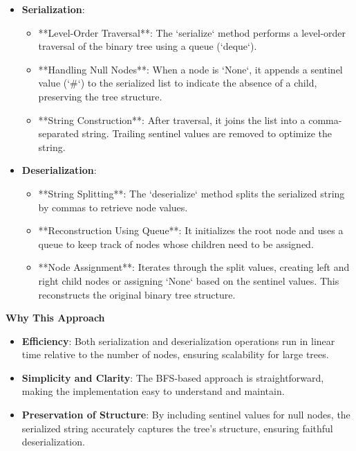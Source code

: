 \begin{itemize}
    \item \textbf{Serialization}:
    \begin{itemize}
        \item **Level-Order Traversal**: The `serialize` method performs a level-order traversal of the binary tree using a queue (`deque`).
        \item **Handling Null Nodes**: When a node is `None`, it appends a sentinel value (`\#`) to the serialized list to indicate the absence of a child, preserving the tree structure.
        \item **String Construction**: After traversal, it joins the list into a comma-separated string. Trailing sentinel values are removed to optimize the string.
    \end{itemize}
    
    \item \textbf{Deserialization}:
    \begin{itemize}
        \item **String Splitting**: The `deserialize` method splits the serialized string by commas to retrieve node values.
        \item **Reconstruction Using Queue**: It initializes the root node and uses a queue to keep track of nodes whose children need to be assigned.
        \item **Node Assignment**: Iterates through the split values, creating left and right child nodes or assigning `None` based on the sentinel values. This reconstructs the original binary tree structure.
    \end{itemize}
\end{itemize}

\textbf{Why This Approach}

\begin{itemize}
    \item \textbf{Efficiency}: Both serialization and deserialization operations run in linear time relative to the number of nodes, ensuring scalability for large trees.
    \item \textbf{Simplicity and Clarity}: The BFS-based approach is straightforward, making the implementation easy to understand and maintain.
    \item \textbf{Preservation of Structure}: By including sentinel values for null nodes, the serialized string accurately captures the tree's structure, ensuring faithful deserialization.
\end{itemize}

